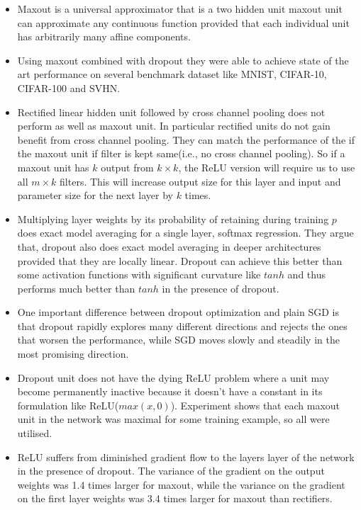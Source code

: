 \documentclass{article}
\begin{document}
\begin{itemize}
    \item Maxout is a universal approximator that is a two hidden unit maxout unit can approximate any continuous function provided that each individual unit has arbitrarily many affine components.
    \item Using maxout combined with dropout they were able to achieve state of the art performance on several benchmark dataset like MNIST, CIFAR-10, CIFAR-100 and SVHN.
    \item Rectified linear hidden unit followed by cross channel pooling does not perform as well as maxout unit. In particular rectified units do not gain benefit from cross channel pooling. They can match the performance of the if the maxout unit if filter is kept same(i.e., no cross channel pooling). So if a maxout unit has $k$ output from $k\times k$, the ReLU version will require us to use all $m\times k$ filters. This will increase output size for this layer and input and parameter size for the next layer by $k$ times.
    \item Multiplying layer weights by its probability of retaining during training $p$ does exact model averaging for a single layer, softmax regression. They argue that, dropout also does exact model averaging in deeper architectures provided that they are locally linear. Dropout can achieve this better than some activation functions with significant curvature like $tanh$ and thus performs much better than $tanh$ in the presence of dropout.   
    \item One important difference between dropout optimization and plain SGD is that dropout rapidly explores many different directions and rejects the ones that worsen the performance, while SGD moves slowly and steadily in the most promising direction.
    \item Dropout unit does not have the dying ReLU problem where a unit may become permanently inactive because it doesn't have a constant in its formulation like ReLU($max(x,0)$). Experiment shows that each maxout unit in the network was maximal for some training example, so all were utilised. 
    \item ReLU suffers from diminished gradient flow to the layers layer of the network in the presence of dropout. The variance of the gradient on the output weights was 1.4 times larger for maxout, while the variance on the gradient on the first layer weights was 3.4 times larger for maxout than rectifiers. 
\end{itemize}
\end{document}
